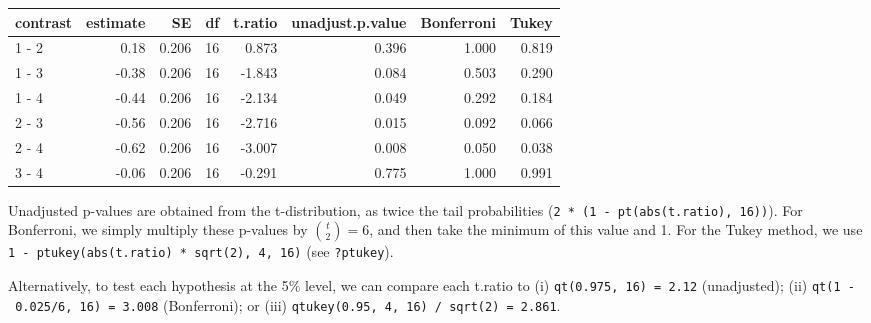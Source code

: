\documentclass[
]{book}
\theoremstyle{definition}
\theoremstyle{definition}
\theoremstyle{definition}
\theoremstyle{definition}
\theoremstyle{remark}
\begin{document}
\begin{tabular}{l|r|r|r|r|r|r|r}
\hline
contrast & estimate & SE & df & t.ratio & unadjust.p.value & Bonferroni & Tukey\\
\hline
1 - 2 & 0.18 & 0.206 & 16 & 0.873 & 0.396 & 1.000 & 0.819\\
\hline
1 - 3 & -0.38 & 0.206 & 16 & -1.843 & 0.084 & 0.503 & 0.290\\
\hline
1 - 4 & -0.44 & 0.206 & 16 & -2.134 & 0.049 & 0.292 & 0.184\\
\hline
2 - 3 & -0.56 & 0.206 & 16 & -2.716 & 0.015 & 0.092 & 0.066\\
\hline
2 - 4 & -0.62 & 0.206 & 16 & -3.007 & 0.008 & 0.050 & 0.038\\
\hline
3 - 4 & -0.06 & 0.206 & 16 & -0.291 & 0.775 & 1.000 & 0.991\\
\hline
\end{tabular}

Unadjusted p-values are obtained from the t-distribution, as twice the tail probabilities (\texttt{2\ *\ (1\ -\ pt(abs(t.ratio),\ 16))}). For Bonferroni, we simply multiply these p-values by \({t \choose 2} = 6\), and then take the minimum of this value and 1. For the Tukey method, we use \texttt{1\ -\ ptukey(abs(t.ratio)\ *\ sqrt(2),\ 4,\ 16)} (see \texttt{?ptukey}).

Alternatively, to test each hypothesis at the 5\% level, we can compare each t.ratio to (i) \texttt{qt(0.975,\ 16)\ =\ 2.12} (unadjusted); (ii) \texttt{qt(1\ -\ 0.025/6,\ 16)\ =\ 3.008} (Bonferroni); or (iii) \texttt{qtukey(0.95,\ 4,\ 16)\ /\ sqrt(2)\ =\ 2.861}.
\end{document}
